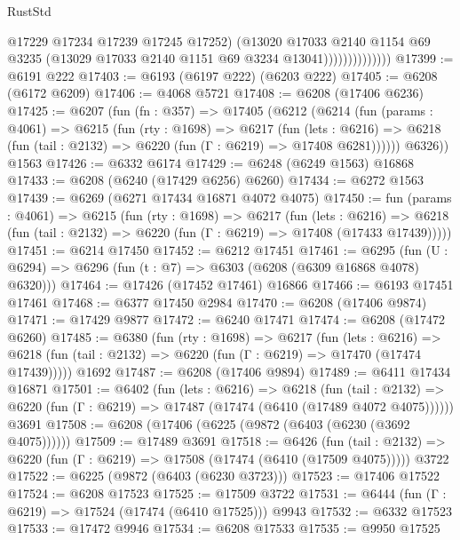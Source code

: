 \begin{lexlean}{RustStd}
\begin{coremodule}
                              @17229
                              @17234
                              @17239
                              @17245
                              @17252)
                            (@13020
                              @17033
                              @2140
                              @1154
                              @69
                              @3235
                              (@13029 @17033 @2140 @1151 @69 @3234 @13041))))))))))))))
@17399 := @6191 @222
@17403 := @6193 (@6197 @222) (@6203 @222)
@17405 := @6208 (@6172 @6209)
@17406 := @4068 @5721
@17408 := @6208 (@17406 @6236)
@17425 := @6207
    (fun (fn : @357) =>
    @17405
      (@6212
        (@6214
          (fun (params : @4061) =>
          @6215
            (fun (rty : @1698) =>
            @6217
              (fun (lets : @6216) =>
              @6218 (fun (tail : @2132) => @6220 (fun (Γ : @6219) => @17408 @6281))))))
        @6326))
    @1563
@17426 := @6332 @6174
@17429 := @6248 (@6249 @1563) @16868
@17433 := @6208 (@6240 (@17429 @6256) @6260)
@17434 := @6272 @1563
@17439 := @6269 (@6271 @17434 @16871 @4072 @4075)
@17450 := fun (params : @4061) =>
  @6215
    (fun (rty : @1698) =>
    @6217
      (fun (lets : @6216) =>
      @6218 (fun (tail : @2132) => @6220 (fun (Γ : @6219) => @17408 (@17433 @17439)))))
@17451 := @6214 @17450
@17452 := @6212 @17451
@17461 := @6295
    (fun (U : @6294) => @6296 (fun (t : @7) => @6303 (@6208 (@6309 @16868 @4078) @6320)))
@17464 := @17426 (@17452 @17461) @16866
@17466 := @6193 @17451 @17461
@17468 := @6377 @17450 @2984
@17470 := @6208 (@17406 @9874)
@17471 := @17429 @9877
@17472 := @6240 @17471
@17474 := @6208 (@17472 @6260)
@17485 := @6380
    (fun (rty : @1698) =>
    @6217
      (fun (lets : @6216) =>
      @6218 (fun (tail : @2132) => @6220 (fun (Γ : @6219) => @17470 (@17474 @17439)))))
    @1692
@17487 := @6208 (@17406 @9894)
@17489 := @6411 @17434 @16871
@17501 := @6402
    (fun (lets : @6216) =>
    @6218
      (fun (tail : @2132) =>
      @6220 (fun (Γ : @6219) => @17487 (@17474 (@6410 (@17489 @4072 @4075))))))
    @3691
@17508 := @6208 (@17406 (@6225 (@9872 (@6403 (@6230 (@3692 @4075))))))
@17509 := @17489 @3691
@17518 := @6426
    (fun (tail : @2132) => @6220 (fun (Γ : @6219) => @17508 (@17474 (@6410 (@17509 @4075)))))
    @3722
@17522 := @6225 (@9872 (@6403 (@6230 @3723)))
@17523 := @17406 @17522
@17524 := @6208 @17523
@17525 := @17509 @3722
@17531 := @6444 (fun (Γ : @6219) => @17524 (@17474 (@6410 @17525))) @9943
@17532 := @6332 @17523
@17533 := @17472 @9946
@17534 := @6208 @17533
@17535 := @9950 @17525

\end{coremodule}
\end{lexlean}
